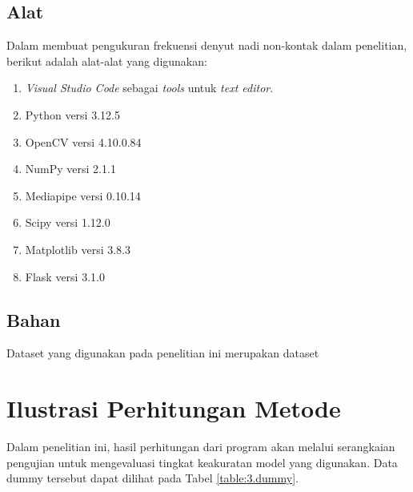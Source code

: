 \subsection{Alat} \label{III.Alat}
Dalam membuat pengukuran frekuensi denyut nadi non-kontak dalam penelitian, berikut adalah alat-alat yang digunakan: \par
\begin{enumerate}[noitemsep]
	\item \textit{Visual Studio Code} sebagai \textit{tools} untuk \textit{text editor}.
	\item Python versi 3.12.5
        \item OpenCV versi 4.10.0.84
	\item NumPy versi 2.1.1
	\item Mediapipe versi 0.10.14
	\item Scipy versi 1.12.0
        \item Matplotlib versi 3.8.3
        \item Flask versi 3.1.0
\end{enumerate}

\subsection{Bahan} \label{III.Bahan}
Dataset yang digunakan pada penelitian ini merupakan dataset 

\section{Ilustrasi Perhitungan Metode} \label{III.Ilustrasi}
Dalam penelitian ini, hasil perhitungan dari program akan melalui serangkaian pengujian untuk mengevaluasi tingkat keakuratan model yang digunakan. Data dummy tersebut dapat dilihat pada Tabel \ref{table:3.dummy}. \par

